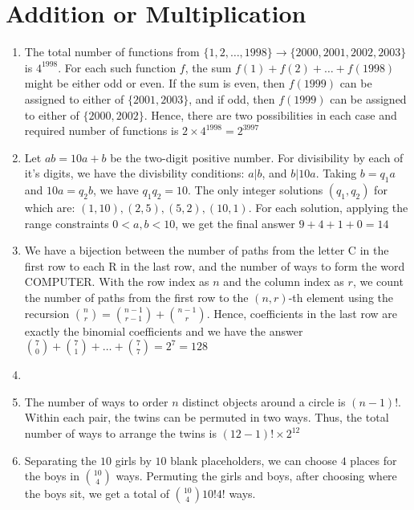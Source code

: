 \documentclass{book}
\begin{document}
\chapter{Addition or Multiplication}

\begin{enumerate}[label={1.\arabic*}]

\item
The total number of functions from $\{1, 2, \dots, 1998\} \to \{2000, 2001,
2002, 2003\}$ is $4^{1998}$. For each such function $f$, the sum
$f(1)+f(2)+\dots+f(1998)$ might be either odd or even. If the sum is
even, then $f(1999)$ can be assigned to either of $\{2001, 2003\}$, and if
odd, then $f(1999)$ can be assigned to either of $\{2000, 2002\}$. Hence,
there are two possibilities in each case and required number of
functions is $2\times4^{1998}=2^{3997}$

\item
Let $ab=10a+b$ be the two-digit positive number. For divisibility by
each of it's digits, we have the divisbility conditions: $a | b$, and
$b | 10a$. Taking $b=q_1a$ and $10a=q_2b$, we have $q_1q_2=10$. The only
integer solutions $(q_1,q_2)$ for which are:
$(1,10),(2,5),(5,2),(10,1)$. For each solution, applying the range
constraints $0<a,b<10$, we get the final answer $9 + 4 + 1 + 0 = 14$

\item
We have a bijection between the number of paths from the letter C in
the first row to each R in the last row, and the number of ways to
form the word COMPUTER. With the row index as $n$ and the column index
as $r$, we count the number of paths from the first row to the $(n,
r)$-th element using the recursion ${n \choose r} = {{n-1} \choose {r-1}}
+ {{n-1} \choose r}$. Hence, coefficients in the last row are exactly the binomial
coefficients and we have the answer ${7 \choose 0} + {7 \choose 1} + \dots +
{7 \choose 7} = 2^7 = 128$

\item

\item
The number of ways to order $n$ distinct objects around a circle is
$(n-1)!$. Within each pair, the twins can be permuted in two ways. Thus,
the total number of ways to arrange the twins is $(12-1)! \times 2^{12}$

\item
Separating the $10$ girls by $10$ blank placeholders, we can choose $4$
places for the boys in $10 \choose 4$ ways. Permuting the girls and
boys, after choosing where the boys sit, we get a total of
${10\choose4}10!4!$ ways.


\end{enumerate}
\end{document}
